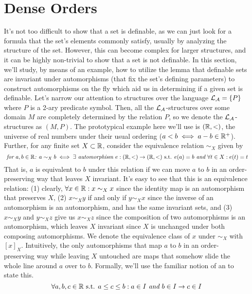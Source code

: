 \documentclass{article}
\begin{document}
\section{Dense Orders}
It's not too difficult to show that a set is definable, as we can just look for a formula that the set's elements commonly satisfy, usually by analyzing the structure of the set. However, this can become complex for larger structures, and it can be highly non-trivial to show that a set is not definable. In this section, we'll study, by means of an example, how to utilize the lemma that definable sets are invariant under automorphisms (that fix the set's defining parameters) to construct automorphisms on the fly which aid us in determining if a given set is definable.
\nn
Let's narrow our attention to structures over the language $ \mathcal{L}_{\mathcal{A}} = \{ P \} $ where $ P $ is a 2-ary predicate symbol. Then, all the $ \mathcal{L}_{\mathcal{A}} $-structures over some domain $ M $ are completely determined by the relation $ P $, so we denote the $ \mathcal{L}_{\mathcal{A}} $-structures as $ (M, P) $. The prototypical example here we'll use is $ (\mathbb{R}, <) $, the universe of real numbers under their usual ordering ($ a < b \iff a - b \in \mathbb{R}^+ $). Further, for any finite set $ X \subset \mathbb{R} $, consider the equivalence relation $ \sim_X $ given by
    $$ \textit{ for $ a, b \in \mathbb{R} $: } a \sim_X b \iff \exists \textit{ automorphism } e: (\mathbb{R}, <) \rightarrow (\mathbb{R}, <) \textnormal{ s.t. } e(a) = b \textit{ and } \forall t \in X: e(t) = t $$
That is, $ a $ is equivalent to $ b $ under this relation if we can move $ a $ to $ b $ in an order-preserving way that leaves $ X $ invariant. It's easy to see that this is an equivalence relation: (1) clearly, $ \forall x \in \mathbb{R}: x \sim_X x $ since the identity map is an automorphism that preserves $ X $, (2) $ x \sim_X y $ if and only if $ y \sim_X x $ since the inverse of an automorphism is an automorphism, and has the same invariant sets, and (3) $ x \sim_X y $ and $ y \sim_X z $ give us $ x \sim_X z $ since the composition of two automorphisms is an automorphism, which leaves $ X $ invariant since $ X $ is unchanged under both composing automorphisms. We denote the equivalence class of $ x $ under $ \sim_X $ with $ [x]_X $.
\nn
Intuitively, the only automorphisms that map $ a $ to $ b $ in an order-preserving way while leaving $ X $ untouched are maps that somehow slide the whole line around $ a $ over to $ b $. Formally, we'll use the familiar notion of an  to state this.
    $$ \forall a, b, c \in \mathbb{R} \textnormal{ s.t. } a \leq c \leq b: a \in I \textit{ and } b \in I \rightarrow c \in I $$
\end{document}
